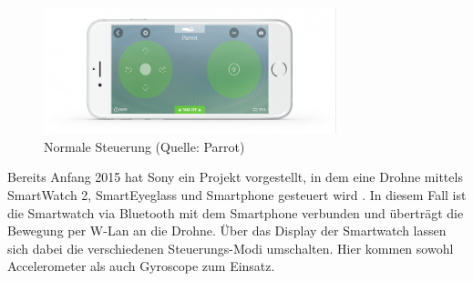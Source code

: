 \documentclass{article}
\begin{document}
\begin{figure}[htb]
\begin{minipage}[b]{1.0\linewidth}
  \centering
\centerline{\includegraphics[width= 85mm]{freeflight_mini.png}}
\end{minipage}
\caption{Normale Steuerung (Quelle: Parrot)}
\label{fig:freeflight}
\end{figure}

Bereits Anfang 2015 hat Sony ein Projekt vorgestellt, in dem eine Drohne mittels SmartWatch 2, SmartEyeglass und Smartphone gesteuert wird \cite{sonyflight}. In diesem Fall ist die Smartwatch via Bluetooth mit dem Smartphone verbunden und überträgt die Bewegung per W-Lan an die Drohne. Über das Display der Smartwatch lassen sich dabei die verschiedenen Steuerungs-Modi umschalten. Hier kommen sowohl Accelerometer als auch Gyroscope zum Einsatz.
\end{document}
